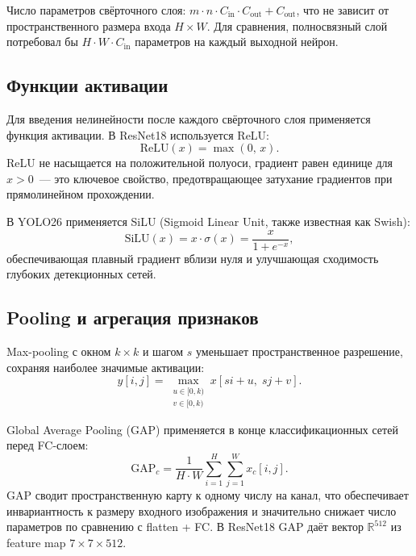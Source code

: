 \documentclass[10pt,a4paper]{report}
\numberwithin{equation}{chapter}
\numberwithin{figure}{chapter}
\numberwithin{table}{chapter}
\begin{document}
Число параметров свёрточного слоя: $m \cdot n \cdot C_{\mathrm{in}}
\cdot C_{\mathrm{out}} + C_{\mathrm{out}}$, что не зависит от
пространственного размера входа $H \times W$. Для сравнения,
полносвязный слой потребовал бы $H \cdot W \cdot C_{\mathrm{in}}$
параметров на каждый выходной нейрон.

\subsection{Функции активации}

Для введения нелинейности после каждого свёрточного слоя
применяется функция активации. В ResNet18 используется ReLU:
\begin{equation}
  \mathrm{ReLU}(x) = \max(0,\, x).
\end{equation}
ReLU не насыщается на положительной полуоси, градиент равен
единице для $x > 0$~--- это ключевое свойство, предотвращающее
затухание градиентов при прямолинейном прохождении.

В YOLO26 применяется SiLU (Sigmoid Linear Unit,
также известная как Swish):
\begin{equation}
  \mathrm{SiLU}(x) = x \cdot \sigma(x) = \frac{x}{1 + e^{-x}},
\end{equation}
обеспечивающая плавный градиент вблизи нуля и улучшающая
сходимость глубоких детекционных сетей.

\subsection{Pooling и агрегация признаков}

Max-pooling с окном $k\times k$ и шагом $s$ уменьшает
пространственное разрешение, сохраняя наиболее значимые активации:
\begin{equation}
  y[i,j] = \max_{\substack{u\in[0,k)\\ v\in[0,k)}}
            x[si+u,\; sj+v].
\end{equation}

Global Average Pooling (GAP) применяется в конце классификационных
сетей перед FC-слоем:
\begin{equation}
  \mathrm{GAP}_c = \frac{1}{H\cdot W}
    \sum_{i=1}^{H}\sum_{j=1}^{W} x_c[i,j].
\end{equation}
GAP сводит пространственную карту к одному числу на канал,
что обеспечивает инвариантность к размеру входного изображения
и значительно снижает число параметров по сравнению с flatten + FC.
В ResNet18 GAP даёт вектор $\mathbb{R}^{512}$ из feature map
$7\times7\times512$.
\end{document}
